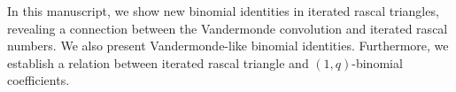 In this manuscript, we show new binomial identities in iterated rascal triangles,
revealing a connection between the Vandermonde convolution and iterated rascal numbers.
We also present Vandermonde-like binomial identities.
Furthermore, we establish a relation between iterated rascal triangle and $(1,q)$-binomial coefficients.
